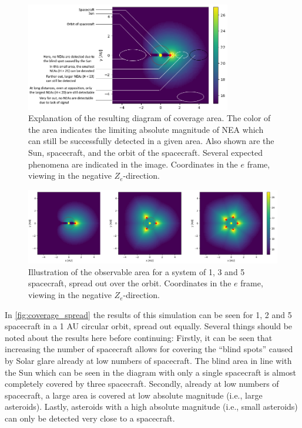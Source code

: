 \begin{figure}[htbp]
 \centering
 \includegraphics[width=0.8\textwidth]{img/coverage_explanation_text.png}
 \caption{Explanation of the resulting diagram of coverage area. The color of the area indicates the limiting absolute magnitude of NEA which can still be successfully detected in a given area. Also shown are the Sun, spacecraft, and the orbit of the spacecraft. Several expected phenomena are indicated in the image. Coordinates in the $e$ frame, viewing in the negative $Z_e$-direction.}
 \label{fig:coverageexplanation}
\end{figure}


\begin{figure}[htbp]
 \centering
 \includegraphics[width=1.0\textwidth]{img/coverage_spread.png}
 \caption{Illustration of the observable area for a system of 1, 3 and 5 spacecraft, spread out over the orbit. Coordinates in the $e$ frame, viewing in the negative $Z_e$-direction.}
 \label{fig:coverage_spread}
\end{figure}

In \autoref{fig:coverage_spread} the results of this simulation can be seen for 1, 2 and 5 spacecraft in a 1 AU circular orbit, spread out equally. Several things should be noted about the results here before continuing: Firstly, it can be seen that increasing the number of spacecraft allows for covering the ``blind spots'' caused by Solar glare already at low numbers of spacecraft. The blind area in line with the Sun which can be seen in the diagram with only a single spacecraft is almost completely covered by three spacecraft. Secondly, already at low numbers of spacecraft, a large area is covered at low absolute magnitude (i.e., large asteroids). Lastly, asteroids with a high absolute magnitude (i.e., small asteroids) can only be detected very close to a spacecraft. \\

